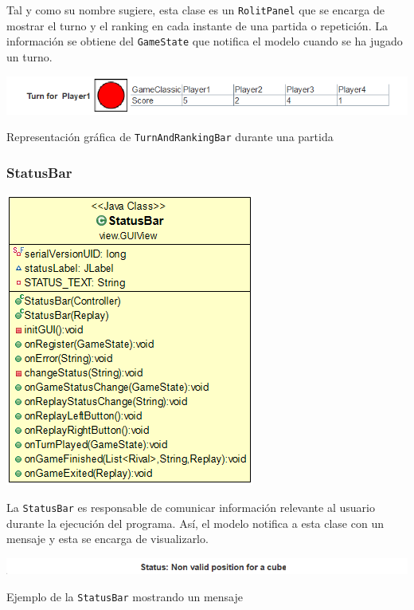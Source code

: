 \documentclass[../DocumentoOficial.tex]{subfiles}
\begin{document}
Tal y como su nombre sugiere, esta clase es un \texttt{RolitPanel} que se encarga de mostrar el turno y el ranking en cada instante de una partida o repetición. La información se obtiene del \texttt{GameState} que notifica el modelo cuando se ha jugado un turno.


\begin{center}
\includegraphics[scale=0.8]{turnranking-pic.png}

Representación gráfica de \texttt{TurnAndRankingBar} durante una partida
\end{center}

\newpage
\subsubsection{StatusBar}
\begin{center}
\includegraphics[scale=0.60]{statusbar-uml.png}
\end{center}

La \texttt{StatusBar} es responsable de comunicar información relevante al usuario durante la ejecución del programa. Así, el modelo notifica a esta clase con un mensaje y esta se encarga de visualizarlo.

\begin{center}
\includegraphics[scale=0.80]{statusbar-pic.png}

Ejemplo de la \texttt{StatusBar} mostrando un mensaje
\end{center}
\end{document}
